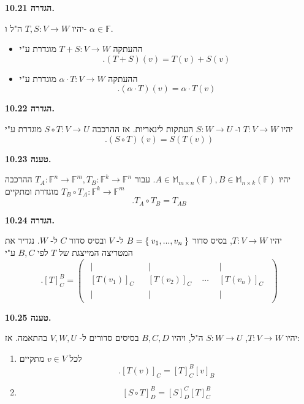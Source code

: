 \documentclass[12pt]{report}
\theoremstyle{plain}
\theoremstyle{definition}
\newcommand{\F}{\mathbb{F}}
\newcommand{\M}{\mathbb{M}}
\newcommand{\0}{\mathbf{0}}
\begin{document}
\noindent\textbf{הגדרה 10.21.}

יהיו
$T,S:V\to W$
ה"ל ו-
$\alpha\in\F$.
\begin{itemize}
\item 
ההעתקה
$T+S:V\to W$
מוגדרת ע"י
$$
.(T+S)(v)=T(v)+S(v)
$$


\item 
ההעתקה
$\alpha\cdot T:V\to W$
מוגדרת ע"י
$$
.(\alpha\cdot T)(v)=\alpha\cdot T(v)
$$


\end{itemize}
\bigskip
\bigskip

\noindent\textbf{הגדרה 10.22.}

יהיו
$T:V\to W$
ו-
$S:W\to U$
העתקות לינאריות. אז ההרכבה
$S\circ T:V\to U$
מוגדרת ע"י
$$
.(S\circ T)(v)=S(T(v))
$$
\bigskip
\bigskip

\noindent\textbf{טענה 10.23.}

יהיו
$A\in\M_{m\times n}(\F),B\in\M_{n\times k}(\F)$.
עבור
$T_A:\F^n\to\F^m,T_B:\F^k\to\F^n$
ההרכבה
$T_B\circ T_A:\F^k\to\F^m$
מוגדרת ומתקיים
$$
.T_A\circ T_B=T_{AB}
$$
\bigskip
\bigskip

\noindent\textbf{הגדרה 10.24.}

יהיו
$T:V\to W$,
בסיס סדור
$B=\Set{v_1,...,v_n}$
ל-
$V$
ובסיס סדור
$C$
ל-
$W$.
נגדיר את המטריצה המייצגת של
$T$
לפי
$B,C$
ע"י
$$
.[T]_C^B=\begin{pmatrix}
\begin{array}{c}
|\\[-0.4ex]
[T(v_1)]_C\\[-0.4ex]
|
\end{array}
&
\begin{array}{c}
|\\[-0.4ex]
[T(v_2)]_C\\[-0.4ex]
|
\end{array}
&
\cdots
&
\begin{array}{c}
|\\[-0.4ex]
[T(v_n)]_C\\[-0.4ex]
|
\end{array}
\end{pmatrix}
$$
\bigskip
\bigskip

\noindent\textbf{טענה 10.25.}

יהיו
$T:V\to W$,
$S:W\to U$
ה"ל, ויהיו
$B,C,D$
בסיסים סדורים ל-
$V,W,U$
בהתאמה. אז:

\begin{enumerate}[label=\alph*.]
\item 
לכל 
$v\in V$
מתקיים
$$
.[T(v)]_C=[T]_C^B[v]_B
$$


\item 
$$
[S\circ T]_D^B=[S]_D^C[T]_C^B
$$


\end{enumerate}
\bigskip
\bigskip
\end{document}
